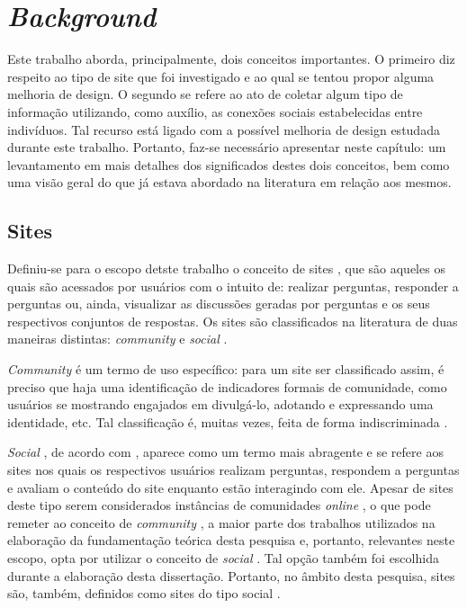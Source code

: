 \chapter{\textit{Background}}
Este trabalho aborda, principalmente, dois conceitos importantes. O primeiro diz respeito ao tipo de site que foi investigado e ao qual se tentou propor alguma melhoria de design. O segundo se refere ao ato de coletar algum tipo de informação utilizando, como auxílio, as conexões sociais estabelecidas entre indivíduos. Tal recurso está ligado com a possível melhoria de design estudada durante este trabalho. Portanto, faz-se necessário apresentar neste capítulo: um levantamento em mais detalhes dos significados destes dois conceitos, bem como uma visão geral do que já estava abordado na literatura em relação aos mesmos.

\section{Sites \qa}
Definiu-se para o escopo detste trabalho o conceito de sites \qanospace, que são aqueles os quais são acessados por usuários com o intuito de: realizar perguntas, responder a perguntas ou, ainda, visualizar as discussões geradas por perguntas e os seus respectivos conjuntos de respostas. Os sites \qa são classificados na literatura de duas maneiras distintas: \textit{community} \qa e \textit{social} \qa \cite{gazan2011social}.

\textit{Community} \qa é um termo de uso específico: para um site ser classificado assim, é preciso que haja uma identificação de indicadores formais de comunidade, como usuários se mostrando engajados em divulgá-lo, adotando e expressando uma identidade, etc. \cite{kling2005understanding} Tal classificação é, muitas vezes, feita de forma indiscriminada \cite{rosenbaum2010structuration}.

\textit{Social} \qanospace, de acordo com \cite{gazan2011social}, aparece como um termo mais abragente e se refere aos sites nos quais os respectivos usuários realizam perguntas, respondem a perguntas e avaliam o conteúdo do site enquanto estão interagindo com ele. Apesar de sites deste tipo serem considerados instâncias de comunidades \textit{online} \cite{rosenbaum2010structuration}, o que pode remeter ao conceito de \textit{community} \qanospace, a maior parte dos trabalhos utilizados na elaboração da fundamentação teórica desta pesquisa e, portanto, relevantes neste escopo, opta por utilizar o conceito de \textit{social} \qanospace. Tal opção também foi escolhida durante a elaboração desta dissertação. Portanto, no âmbito desta pesquisa, sites \qa  são, também, definidos como sites do tipo social \qanospace.


